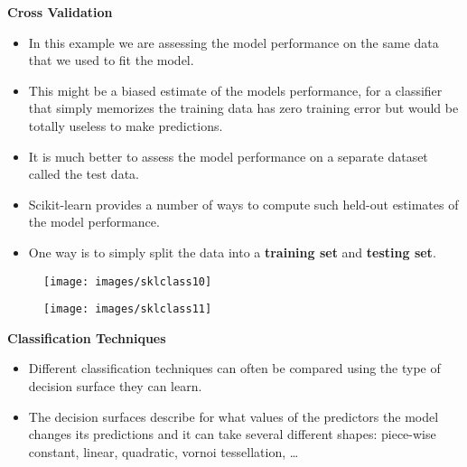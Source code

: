 \documentclass[SKL-MASTER.tex]{subfiles}
\begin{document}
\newpage
\LARGE
	\textbf{Cross Validation}
\begin{itemize}
\item In this example we are assessing the model performance on the same data that we used to fit the model. 
\item This might be a biased estimate of the models performance, for a classifier that simply memorizes the training data has zero training error but would be totally useless to make predictions.
\item  It is much better to assess the model performance on a separate dataset called the test data.
\item  Scikit-learn provides a number of ways to compute such held-out estimates of the model performance. \item One way is to simply split the data into a \textbf{training set} and \textbf{testing set}.
\end{itemize}
\newpage
\begin{figure}[h!]
\centering
\texttt{[image: images/sklclass10]}

\end{figure}

\begin{figure}[h!]
\centering
\texttt{[image: images/sklclass11]}

\end{figure}

\newpage
\LARGE
\textbf{Classification Techniques}
\begin{itemize}
\item Different classification techniques can often be compared using the type of decision surface they can learn. \item The decision surfaces describe for what values of the predictors the model changes its predictions and it can take several different shapes: piece-wise constant, linear, quadratic, vornoi tessellation, \ldots
\end{itemize}
\end{document}

